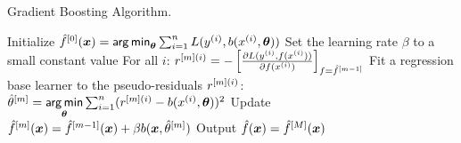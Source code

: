 \begin{algorithm}[H]
  \begin{footnotesize}
  \begin{center}
  \caption{Gradient Boosting Algorithm.}
    \begin{algorithmic}[1]
      \State Initialize $\hat{f}^{[0]}(\bm{x}) = \mathop{\sf arg\,min}_{\bm{\theta}} \sum_{i=1}^n L(y^{(i)}, b(x^{(i)}, \bm{\theta}))$
      \State Set the learning rate $\beta$ to a small constant value
          \State For all $i$: $r^{[m](i)} = -\left[\frac{\partial L(y^{(i)}, f(x^{(i)}))}{\partial f(x^{(i)})}\right]_{f=\hat{f}^{[m-1]}}$
        \State Fit a regression base learner to the pseudo-residuals $r^{[m](i)}$:
        \State $\hat{\theta}^{[m]} = \mathop{\sf arg\,min} \limits_{\bm{\theta}} \sum_{i=1}^n (r^{[m](i)} - b(x^{(i)}, \bm{\theta}))^2$
        \State Update $\hat{f}^{[m]}(\bm{x}) = \hat{f}^{[m-1]}(\bm{x}) + \beta b(\bm{x}, \hat{\theta}^{[m]})$
      \EndFor
      \State Output $\hat{f}(\bm{x}) = \hat{f}^{[M]}(\bm{x})$
    \end{algorithmic}
    \end{center}
    \end{footnotesize}
\end{algorithm}
